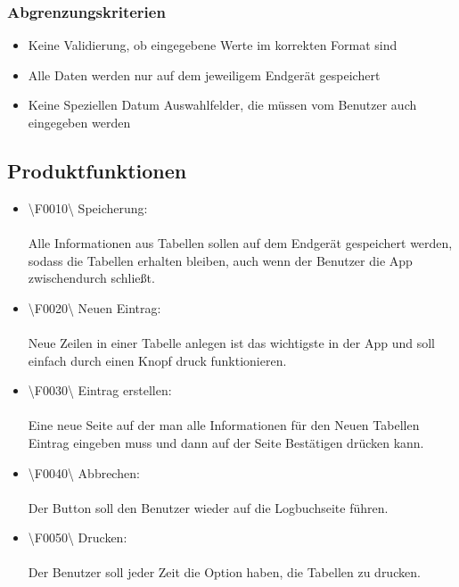 \documentclass[a4paper]{article} %
\begin{document}
    \subsubsection{Abgrenzungskriterien}
    \vspace{0.5cm}

    \begin{itemize}
        \item Keine Validierung, ob eingegebene Werte im korrekten Format sind
        \item Alle Daten werden nur auf dem jeweiligem Endgerät gespeichert
        \item Keine Speziellen Datum Auswahlfelder, die müssen vom Benutzer auch eingegeben werden
    \end{itemize}
    \pagebreak
    
    \subsection{Produktfunktionen}
    \vspace{1cm}
    \begin{itemize}
        \item \textbackslash F0010\textbackslash{} Speicherung: \\
        \noindent \\Alle Informationen aus Tabellen sollen auf dem Endgerät gespeichert werden, sodass die Tabellen erhalten bleiben, auch wenn der Benutzer die App zwischendurch schließt.\\\vspace{0.5cm}
        \item \textbackslash F0020\textbackslash{} Neuen Eintrag:\\
        \noindent \\Neue Zeilen in einer Tabelle anlegen ist das wichtigste in der App und soll einfach durch einen Knopf druck funktionieren.\\\vspace{0.5cm}
        \item \textbackslash F0030\textbackslash{} Eintrag erstellen: \\
        \noindent \\Eine neue Seite auf der man alle Informationen für den Neuen Tabellen Eintrag eingeben muss und dann auf der Seite Bestätigen drücken kann.\\\vspace{0.5cm}
        \item \textbackslash F0040\textbackslash{} Abbrechen: \\
        \noindent \\Der Button soll den Benutzer wieder auf die Logbuchseite führen.\\\vspace{0.5cm}
        \item \textbackslash F0050\textbackslash{} Drucken:\\
        \noindent \\Der Benutzer soll jeder Zeit die Option haben, die Tabellen zu drucken.\\\vspace{0.5cm}
    \end{itemize}
    \pagebreak
\end{document}
